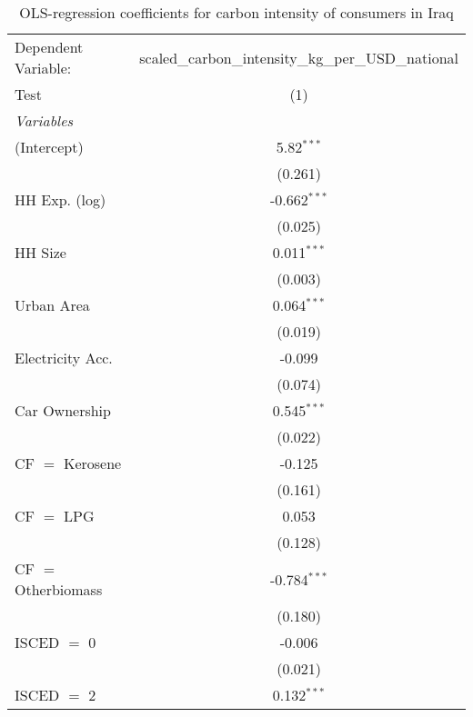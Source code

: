 
\begin{table}[htbp!]
   \centering
   \small
   \begin{adjustbox}{width = 1\textwidth, max height = 0.95\textheight, center}
      \begin{threeparttable}[b]
         \caption{\label{tab:OLS_1_IRQ} OLS-regression coefficients for carbon intensity of consumers in Iraq}
         \begin{tabular}{lc}
            \tabularnewline \midrule \midrule
            Dependent Variable: & scaled\_carbon\_intensity\_kg\_per\_USD\_national\\        
            Test                & (1)\\  
            \midrule
            \emph{Variables}\\
            (Intercept)         & 5.82$^{***}$\\   
                                & (0.261)\\   
            HH Exp. (log)       & -0.662$^{***}$\\   
                                & (0.025)\\   
            HH Size             & 0.011$^{***}$\\   
                                & (0.003)\\   
            Urban Area          & 0.064$^{***}$\\   
                                & (0.019)\\   
            Electricity Acc.    & -0.099\\   
                                & (0.074)\\   
            Car Ownership       & 0.545$^{***}$\\   
                                & (0.022)\\   
            CF $=$ Kerosene     & -0.125\\   
                                & (0.161)\\   
            CF $=$ LPG          & 0.053\\   
                                & (0.128)\\   
            CF $=$ Otherbiomass & -0.784$^{***}$\\   
                                & (0.180)\\   
            ISCED $=$ 0         & -0.006\\   
                                & (0.021)\\   
            ISCED $=$ 2         & 0.132$^{***}$\\   

\end{tabular}
\end{threeparttable}
\end{adjustbox}
\end{table}
